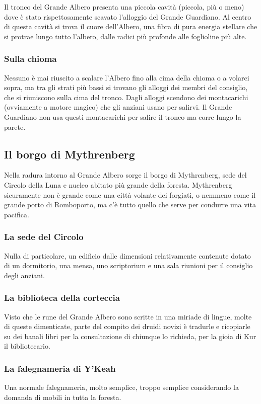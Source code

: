 Il tronco del Grande Albero presenta una piccola cavità (piccola, più o meno) dove è stato rispettosamente scavato l'alloggio del Grande Guardiano. Al centro di questa cavità si trova il cuore dell'Albero, una fibra di pura energia stellare che si protrae lungo tutto l'albero, dalle radici più profonde alle foglioline più alte.

\subsubsection{Sulla chioma}

Nessuno è mai riuscito a scalare l'Albero fino alla cima della chioma o a volarci sopra, ma tra gli strati più bassi si trovano gli alloggi dei membri del consiglio, che si riuniscono sulla cima del tronco. Dagli alloggi scendono dei montacarichi (ovviamente a motore magico) che gli anziani usano per salirvi. Il Grande Guardiano non usa questi montacarichi per salire il tronco ma corre lungo la parete.

\subsection{Il borgo di Mythrenberg}

Nella radura intorno al Grande Albero sorge il borgo di Mythrenberg, sede del Circolo della Luna e nucleo abitato più grande della foresta. Mythrenberg sicuramente non è grande come una città volante dei forgiati, o nemmeno come il grande porto di Romboporto, ma c'è tutto quello che serve per condurre una vita pacifica.

\subsubsection{La sede del Circolo} Nulla di particolare, un edificio dalle dimensioni relativamente contenute dotato di un dormitorio, una mensa, uno scriptorium e una sala riunioni per il consiglio degli anziani.

\subsubsection{La biblioteca della corteccia} Visto che le rune del Grande Albero sono scritte in una miriade di lingue, molte di queste dimenticate, parte del compito dei druidi novizi è tradurle e ricopiarle su dei banali libri per la consultazione di chiunque lo richieda, per la gioia di Kur il bibliotecario.

\subsubsection{La falegnameria di Y'Keah} Una normale falegnameria, molto semplice, troppo semplice considerando la domanda di mobili in tutta la foresta.

